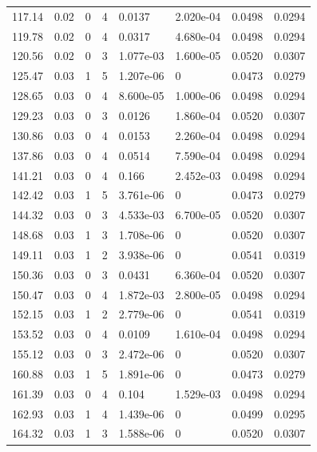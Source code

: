 \documentclass[preview]{standalone}
\begin{document}
{{{\begin{tabular}{L{1.2cm}C{1.2cm} C{0.3cm}C{0.5cm} C{1.4cm}C{1.4cm} C{1.4cm}C{1.4cm}}
  117.14  &  0.02  & 0     &  4 &  0.0137  & 2.020e-04  & 0.0498 &  0.0294   \\ 
  119.78  &  0.02  & 0     &  4 &  0.0317  & 4.680e-04  & 0.0498 &  0.0294   \\ 
  120.56  &  0.02  & 0     &  3 &  1.077e-03  & 1.600e-05  & 0.0520 &  0.0307   \\ 
  125.47  &  0.03  & 1     &  5 &  1.207e-06  & 0  & 0.0473 &  0.0279   \\ 
  128.65  &  0.03  & 0     &  4 &  8.600e-05  & 1.000e-06  & 0.0498 &  0.0294   \\ 
  129.23  &  0.03  & 0     &  3 &  0.0126  & 1.860e-04  & 0.0520 &  0.0307   \\ 
  130.86  &  0.03  & 0     &  4 &  0.0153  & 2.260e-04  & 0.0498 &  0.0294   \\ 
  137.86  &  0.03  & 0     &  4 &  0.0514  & 7.590e-04  & 0.0498 &  0.0294   \\ 
  141.21  &  0.03  & 0     &  4 &  0.166  & 2.452e-03  & 0.0498 &  0.0294   \\ 
  142.42  &  0.03  & 1     &  5 &  3.761e-06  & 0  & 0.0473 &  0.0279   \\ 
  144.32  &  0.03  & 0     &  3 &  4.533e-03  & 6.700e-05  & 0.0520 &  0.0307   \\ 
  148.68  &  0.03  & 1     &  3 &  1.708e-06  & 0  & 0.0520 &  0.0307   \\ 
  149.11  &  0.03  & 1     &  2 &  3.938e-06  & 0  & 0.0541 &  0.0319   \\ 
  150.36  &  0.03  & 0     &  3 &  0.0431  & 6.360e-04  & 0.0520 &  0.0307   \\ 
  150.47  &  0.03  & 0     &  4 &  1.872e-03  & 2.800e-05  & 0.0498 &  0.0294   \\ 
  152.15  &  0.03  & 1     &  2 &  2.779e-06  & 0  & 0.0541 &  0.0319   \\ 
  153.52  &  0.03  & 0     &  4 &  0.0109  & 1.610e-04  & 0.0498 &  0.0294   \\ 
  155.12  &  0.03  & 0     &  3 &  2.472e-06  & 0  & 0.0520 &  0.0307   \\ 
  160.88  &  0.03  & 1     &  5 &  1.891e-06  & 0  & 0.0473 &  0.0279   \\ 
  161.39  &  0.03  & 0     &  4 &  0.104  & 1.529e-03  & 0.0498 &  0.0294   \\ 
  162.93  &  0.03  & 1     &  4 &  1.439e-06  & 0  & 0.0499 &  0.0295   \\ 
  164.32  &  0.03  & 1     &  3 &  1.588e-06  & 0  & 0.0520 &  0.0307   \\ 

\end{tabular}}}}
\end{document}
